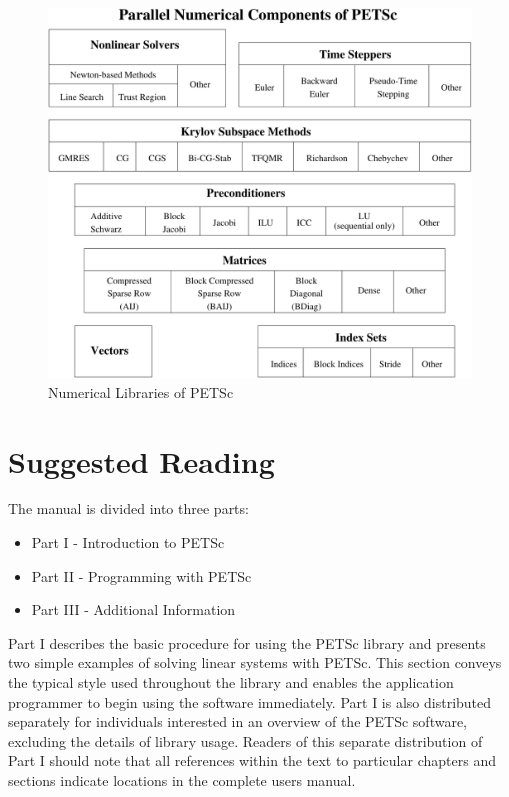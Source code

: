 \begin{figure}[hbt]
\centerline{ \includegraphics{zoom}}
\caption{Numerical Libraries of PETSc}
\label{fig_2}
\end{figure}

\section{Suggested Reading}

The manual is
divided into three parts:
\begin{itemize}
\item Part I - Introduction to PETSc
\item Part II - Programming with PETSc
\item Part III - Additional Information
\end{itemize}

Part I describes
the basic procedure for using the PETSc library and presents two
simple examples of solving linear systems with PETSc.  This section
conveys the typical style used throughout the library and enables the
application programmer to begin using the software immediately.
Part I is also distributed separately for individuals interested in an 
overview of the PETSc software, excluding the details of library usage.
Readers of this separate distribution of Part I should note that all
references within the text to particular chapters and sections 
indicate locations in the complete users manual.

